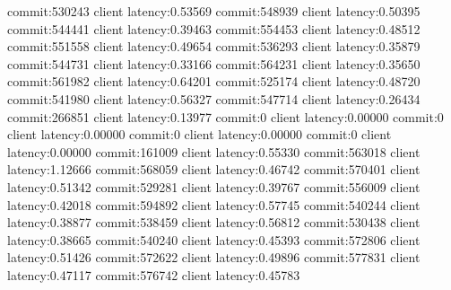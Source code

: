 commit:530243 client latency:0.53569
commit:548939 client latency:0.50395
commit:544441 client latency:0.39463
commit:554453 client latency:0.48512
commit:551558 client latency:0.49654
commit:536293 client latency:0.35879
commit:544731 client latency:0.33166
commit:564231 client latency:0.35650
commit:561982 client latency:0.64201
commit:525174 client latency:0.48720
commit:541980 client latency:0.56327
commit:547714 client latency:0.26434
commit:266851 client latency:0.13977
commit:0 client latency:0.00000
commit:0 client latency:0.00000
commit:0 client latency:0.00000
commit:0 client latency:0.00000
commit:161009 client latency:0.55330
commit:563018 client latency:1.12666
commit:568059 client latency:0.46742
commit:570401 client latency:0.51342
commit:529281 client latency:0.39767
commit:556009 client latency:0.42018
commit:594892 client latency:0.57745
commit:540244 client latency:0.38877
commit:538459 client latency:0.56812
commit:530438 client latency:0.38665
commit:540240 client latency:0.45393
commit:572806 client latency:0.51426
commit:572622 client latency:0.49896
commit:577831 client latency:0.47117
commit:576742 client latency:0.45783